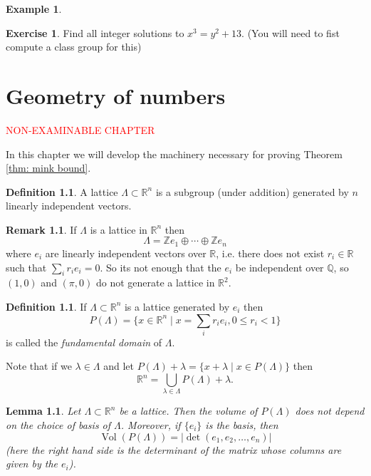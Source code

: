 \documentclass[11pt,a4paper]{report}
\theoremstyle{plain}
\newtheorem{lem}[subsection]{Lemma}
\theoremstyle{definition}
\newtheorem{definition}[subsection]{Definition}
\newtheorem{exmp}[subsection]{Example}
\theoremstyle{definition}
\newtheorem{rmrk}[subsection]{Remark}
\newtheorem{question}[subsection]{Exercise}
\newcommand{\ZZ}{\mathbb{Z}}
\newcommand{\RR}{\mathbb{R}}
\def\QQ{\mathbb{Q}}
\def \lam {\lambda}
\DeclareMathOperator{\Vol}{Vol}
\begin{document}
\begin{exmp}
		
		
		
		
	\end{exmp}
	
	
	
	\begin{question}
		Find all integer solutions to $x^3=y^2+13$. (You will need to fist compute a class group for this)
	\end{question}
	
	
	
	
	
	\chapter{Geometry of numbers}
	
	\textcolor{red}{NON-EXAMINABLE CHAPTER}
	
	In this chapter we will develop the machinery necessary for proving Theorem \ref{thm: mink bound}.
	
	\begin{definition}
		A lattice $\Lambda \subset \RR^n$ is a subgroup (under addition) generated by $n$ linearly independent vectors.
	\end{definition}
	
	\begin{rmrk}
		If $\Lambda$ is a lattice in $\RR^n$ then \[\Lambda= \ZZ e_1 \oplus \cdots \oplus \ZZ e_n\] where $e_i$ are linearly independent vectors over $\RR$, i.e. there does not exist $r_i \in \RR$ such that $\sum_i r_ie_i =0$.
		So its not enough that the $e_i$ be independent over $\QQ$, so $(1,0)$ and $(\pi,0)$ do not generate a lattice in $\RR^2$.
	\end{rmrk}
	
	\begin{definition}
		If $\Lambda \subset \RR^n$ is a lattice generated by $e_i$ then \[P(\Lambda)=\{x \in \RR^n \mid x=\sum_i r_ie_i, 0 \leq r_i < 1 \}\] is called the \textit{fundamental domain} of $\Lambda$.
	\end{definition}
	
	Note that if we $\lam \in \Lambda$  and let $P(\Lambda)+\lambda=\{x+ \lam \mid x \in P(\Lambda)\}$ then \[\RR^n= \bigcup_{\lam \in \Lambda} P(\Lambda) +\lam. \]
	
	\begin{lem}
		Let $\Lambda \subset \RR^n$ be a lattice. Then the volume of $P(\Lambda)$ does not depend on the choice of basis of $\Lambda$. Moreover, if $\{e_i\}$ is the basis, then \[\Vol(P(\Lambda))=|\det(e_1,e_2,\dots,e_n)| \] (here the right hand side is the determinant of the matrix whose columns are given by the $e_i$).
	\end{lem}
	
\end{document}
